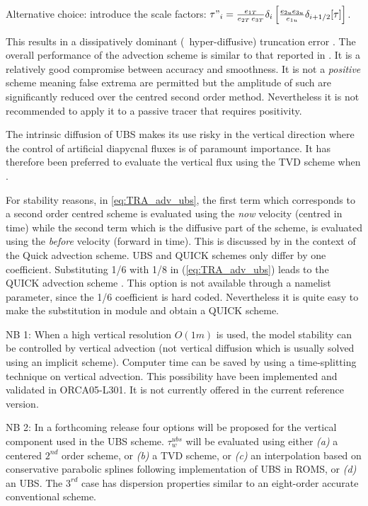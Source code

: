 \documentclass[../main/NEMO_manual]{subfiles}
\begin{document}
Alternative choice: introduce the scale factors:
$\tau "_i =\frac{e_{1T}}{e_{2T}\,e_{3T}}\delta_i \left[ \frac{e_{2u} e_{3u} }{e_{1u} }\delta_{i+1/2}[\tau] \right]$.

This results in a dissipatively dominant (\ie\ hyper-diffusive) truncation error
\citep{shchepetkin.mcwilliams_OM05}.
The overall performance of the advection scheme is similar to that reported in \cite{farrow.stevens_JPO95}.
It is a relatively good compromise between accuracy and smoothness.
It is not a \emph{positive} scheme meaning false extrema are permitted but
the amplitude of such are significantly reduced over the centred second order method.
Nevertheless it is not recommended to apply it to a passive tracer that requires positivity.

The intrinsic diffusion of UBS makes its use risky in the vertical direction where
the control of artificial diapycnal fluxes is of paramount importance.
It has therefore been preferred to evaluate the vertical flux using the TVD scheme when
.

For stability reasons, in \autoref{eq:TRA_adv_ubs}, the first term which corresponds to
a second order centred scheme is evaluated using the \textit{now} velocity (centred in time) while
the second term which is the diffusive part of the scheme, is evaluated using the \textit{before} velocity
(forward in time).
This is discussed by \citet{webb.de-cuevas.ea_JAOT98} in the context of the Quick advection scheme.
UBS and QUICK schemes only differ by one coefficient.
Substituting 1/6 with 1/8 in (\autoref{eq:TRA_adv_ubs}) leads to the QUICK advection scheme \citep{webb.de-cuevas.ea_JAOT98}.
This option is not available through a namelist parameter, since the 1/6 coefficient is hard coded.
Nevertheless it is quite easy to make the substitution in  module and obtain a QUICK scheme.

NB 1: When a high vertical resolution $O(1m)$ is used, the model stability can be controlled by vertical advection
(not vertical diffusion which is usually solved using an implicit scheme).
Computer time can be saved by using a time-splitting technique on vertical advection.
This possibility have been implemented and validated in ORCA05-L301.
It is not currently offered in the current reference version.

NB 2: In a forthcoming release four options will be proposed for the vertical component used in the UBS scheme.
$\tau_w^{ubs}$ will be evaluated using either \textit{(a)} a centered $2^{nd}$ order scheme,
or \textit{(b)} a TVD scheme, or \textit{(c)} an interpolation based on conservative parabolic splines following
\citet{shchepetkin.mcwilliams_OM05} implementation of UBS in ROMS, or \textit{(d)} an UBS.
The $3^{rd}$ case has dispersion properties similar to an eight-order accurate conventional scheme.
\end{document}
